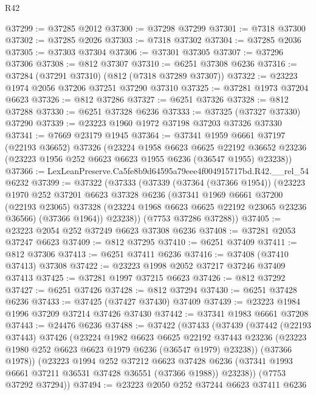 \begin{lexlean}{R42}
\begin{coremodule}
{@37299 := @37285 @2012
@37300 := @37298 @37299
@37301 := @7318 @37300
@37302 := @37285 @2026
@37303 := @7318 @37302
@37304 := @37285 @2036
@37305 := @37303 @37304
@37306 := @37301 @37305
@37307 := @37296 @37306
@37308 := @812 @37307
@37310 := @6251 @37308 @6236
@37316 := @37284 (@37291 @37310) (@812 (@7318 @37289 @37307))
@37322 := @23223 @1974 @2056 @37206 @37251 @37290 @37310
@37325 := @37281 @1973 @37204 @6623
@37326 := @812 @37286
@37327 := @6251 @37326
@37328 := @812 @37288
@37330 := @6251 @37328 @6236
@37333 := @37325 (@37327 @37330) @37290
@37339 := @23223 @1960 @1972 @37198 @37203 @37326 @37330
@37341 := @7669 @23179 @1945
@37364 := @37341
    @1959
    @6661
    @37197
    (@22193 @36652)
    @37326
    (@23224
      @1958
      @6623
      @6625
      @22192
      @36652
      @23236
      (@23223 @1956 @252 @6623 @6623 @1955 @6236 (@36547 @1955) @23238))
@37366 := LexLeanPreserve.Ca5fe8b9d64595a79eee4f004915717bd.R42.__rel_54 @6232
@37399 := @37322
    (@37333
      (@37339
        (@37364 (@37366 @1954))
        (@23223
          @1970
          @252
          @37201
          @6623
          @37328
          @6236
          (@37341
            @1969
            @6661
            @37200
            (@22193 @23065)
            @37328
            (@23224 @1968 @6623 @6625 @22192 @23065 @23236 @36566)
            (@37366 @1964))
          @23238))
      (@7753 @37286 @37288))
@37405 := @23223 @2054 @252 @37249 @6623 @37308 @6236
@37408 := @37281 @2053 @37247 @6623
@37409 := @812 @37295
@37410 := @6251 @37409
@37411 := @812 @37306
@37413 := @6251 @37411 @6236
@37416 := @37408 (@37410 @37413) @37308
@37422 := @23223 @1998 @2052 @37217 @37246 @37409 @37413
@37425 := @37281 @1997 @37215 @6623
@37426 := @812 @37292
@37427 := @6251 @37426
@37428 := @812 @37294
@37430 := @6251 @37428 @6236
@37433 := @37425 (@37427 @37430) @37409
@37439 := @23223 @1984 @1996 @37209 @37214 @37426 @37430
@37442 := @37341 @1983 @6661 @37208
@37443 := @24476 @6236
@37488 := @37422
    (@37433
      (@37439
        (@37442
          (@22193 @37443)
          @37426
          (@23224
            @1982
            @6623
            @6625
            @22192
            @37443
            @23236
            (@23223 @1980 @252 @6623 @6623 @1979 @6236 (@36547 @1979) @23238))
          (@37366 @1978))
        (@23223
          @1994
          @252
          @37212
          @6623
          @37428
          @6236
          (@37341 @1993 @6661 @37211 @36531 @37428 @36551 (@37366 @1988))
          @23238))
      (@7753 @37292 @37294))
@37494 := @23223 @2050 @252 @37244 @6623 @37411 @6236
}
\end{coremodule}
\end{lexlean}
